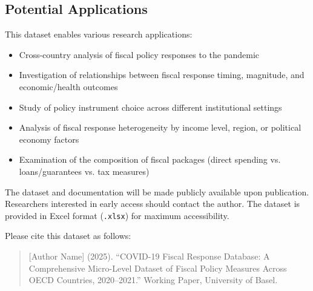 \subsection{Potential Applications}

This dataset enables various research applications:

\begin{itemize}
\item Cross-country analysis of fiscal policy responses to the pandemic
\item Investigation of relationships between fiscal response timing, magnitude, and economic/health outcomes
\item Study of policy instrument choice across different institutional settings
\item Analysis of fiscal response heterogeneity by income level, region, or political economy factors
\item Examination of the composition of fiscal packages (direct spending vs. loans/guarantees vs. tax measures)
\end{itemize}

The dataset and documentation will be made publicly available upon publication. Researchers interested in early access should contact the author. The dataset is provided in Excel format (\texttt{.xlsx}) for maximum accessibility.

Please cite this dataset as follows:

\begin{quote}
[Author Name] (2025). ``COVID-19 Fiscal Response Database: A Comprehensive Micro-Level Dataset of Fiscal Policy Measures Across OECD Countries, 2020--2021.'' Working Paper, University of Basel.
\end{quote}